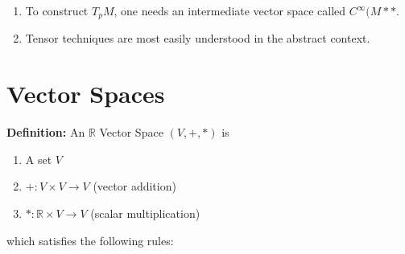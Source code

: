 \documentclass[
  letterpaper,
  DIV=11,
  numbers=noendperiod,
  oneside]{scrreprt}
\providecommand{\tightlist}{%
  \setlength{\itemsep}{0pt}\setlength{\parskip}{0pt}}\usepackage{longtable,booktabs,array}
\begin{document}
\begin{enumerate}
\def\labelenumi{\arabic{enumi}.}
\tightlist
\item
  To construct \(T_pM\), one needs an intermediate vector space called
  \(C^{\infty}(M**\).
\item
  Tensor techniques are most easily understood in the abstract context.
\end{enumerate}

\hypertarget{vector-spaces}{%
\section{Vector Spaces}\label{vector-spaces}}

\textbf{Definition:} An \(\mathbb{R}\) Vector Space \((V, +, *)\) is

\begin{enumerate}
\def\labelenumi{\arabic{enumi}.}
\tightlist
\item
  A set \(V\)
\item
  \(+:V\times V\to V\) (vector addition)
\item
  \(*:\mathbb{R}\times V \to V\) (scalar multiplication)
\end{enumerate}

which satisfies the following rules:
\end{document}
